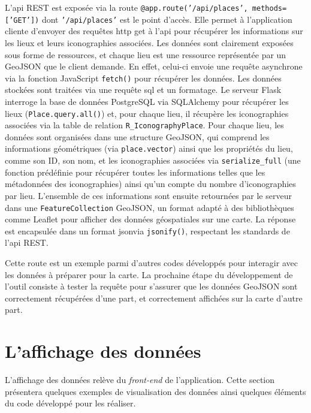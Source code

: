 L'\acrshort{api} REST est exposée via la route \texttt{@app.route('/api/places', methods=['GET'])} dont \texttt{'/api/places'} est le point d'accès. Elle permet à l'application cliente d'envoyer des requêtes \acrshort{http} \acrshort{get} à l'\acrshort{api} pour récupérer les informations sur les lieux et leurs iconographies associées. Les données sont clairement exposées sous forme de ressources, et chaque lieu est une ressource représentée par un GeoJSON que le client demande. En effet, celui-ci envoie une requête asynchrone via la fonction JavaScript \texttt{fetch()} pour récupérer les données. Les données stockées sont traitées via une requête \acrshort{sql} et un formatage. Le serveur Flask interroge la base de données PostgreSQL via SQLAlchemy pour récupérer les lieux (\texttt{Place.query.all()}) et, pour chaque lieu, il récupère les iconographies associées via la table de relation \texttt{R\_IconographyPlace}. Pour chaque lieu, les données sont organisées dans une structure GeoJSON, qui comprend les informations géométriques (via \texttt{place.vector}) ainsi que les propriétés du lieu, comme son ID, son nom, et les iconographies associées via \texttt{serialize\_full} (une fonction prédéfinie pour récupérer toutes les informations telles que les métadonnées des iconographies) ainsi qu'un compte du nombre d'iconographies par lieu. L'ensemble de ces informations sont ensuite retournées par le serveur dans une \texttt{FeatureCollection} GeoJSON, un format adapté à des bibliothèques comme Leaflet pour afficher des données géospatiales sur une carte. La réponse est encapsulée dans un format \acrshort{json}via \texttt{jsonify()}, respectant les standards de l'\acrshort{api} REST. 

Cette route est un exemple parmi d'autres codes développés pour interagir avec les données à préparer pour la carte. La prochaine étape du développement de l'outil consiste à tester la requête pour s'assurer que les données GeoJSON sont correctement récupérées d'une part, et correctement affichées sur la carte d'autre part. 
\section{L'affichage des données}
L'affichage des données relève du \textit{front-end} de l'application. Cette section présentera quelques exemples de visualisation des données ainsi quelques éléments du code développé pour les réaliser. 
